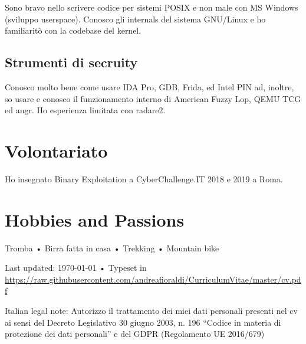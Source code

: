 \documentclass[10pt, a4paper]{article}
\newcommand{\years}[1]{\marginnote{\scriptsize #1}}
\begin{document}
Sono bravo nello scrivere codice per sistemi POSIX e non male con MS Windows (sviluppo userspace).
Conosco gli internals del sistema GNU/Linux e ho familiaritò con la codebase del kernel.

\subsection*{Strumenti di secruity}

Conosco molto bene come usare IDA Pro, GDB, Frida, ed Intel PIN ad, inoltre, so usare e conosco il funzionamento interno di American Fuzzy Lop, QEMU TCG ed angr.
Ho esperienza limitata con radare2.

\section*{Volontariato}
\noindent
\years{2018}Ho insegnato Binary Exploitation a CyberChallenge.IT 2018 e 2019 a Roma.

\section*{Hobbies and Passions}
Tromba • Birra fatta in casa • Trekking • Mountain bike

\vfill{}

\begin{center}
{\scriptsize  Last updated: \today\- •\- 
Typeset in \href{http://nitens.org/taraborelli/cvtex}{
\XeTeX }\\
\href{https://raw.githubusercontent.com/andreafioraldi/CurriculumVitae/master/cv.pdf}{https://raw.githubusercontent.com/andreafioraldi/CurriculumVitae/master/cv.pdf}}
\end{center}

{\scriptsize Italian legal note: Autorizzo il trattamento dei miei dati personali presenti nel cv ai sensi del Decreto Legislativo 30 giugno 2003, n. 196 “Codice in materia di protezione dei dati personali” e del GDPR (Regolamento UE 2016/679)}
\end{document}
